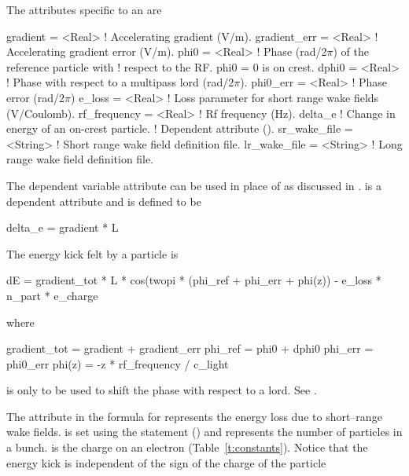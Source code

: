 {{The attributes specific to an  are 
\begin{example}
  gradient     = <Real>   ! Accelerating gradient (V/m).
  gradient_err = <Real>   ! Accelerating gradient error (V/m).
  phi0         = <Real>   ! Phase (rad/2\(\pi\)) of the reference particle with 
                          !   respect to the RF. phi0 = 0 is on crest.
  dphi0        = <Real>   ! Phase with respect to a multipass lord (rad/2\(\pi\)).
  phi0_err     = <Real>   ! Phase error (rad/2\(\pi\))
  e_loss       = <Real>   ! Loss parameter for short range wake fields (V/Coulomb).
  rf_frequency = <Real>   ! Rf frequency (Hz).
  delta_e                 ! Change in energy of an on-crest particle. 
                          !   Dependent attribute ().
  sr_wake_file = <String> ! Short range wake field definition file.
  lr_wake_file = <String> ! Long range wake field definition file.
\end{example}
The dependent variable  attribute can be used in place of
 as discussed in .   is a
dependent attribute and is defined to be
\begin{example}
  delta_e = gradient * L
\end{example}

The energy kick felt by a particle is 
\begin{example}
  dE = gradient_tot * L * cos(twopi * (phi_ref + phi_err + phi(z)) - 
                                                     e_loss * n_part * e_charge 
\end{example}
where
\begin{example}
  gradient_tot = gradient + gradient_err
  phi_ref = phi0 + dphi0
  phi_err = phi0_err
  phi(z) = -z * rf_frequency / c_light
\end{example}
 is only to be used to shift the phase with respect to a 
lord. See .

The  attribute in the formula for  represents the
energy loss due to short--range wake fields.  is set using
the  statement () and represents the
number of particles in a bunch.  is the charge on an
electron (Table~\ref{t:constants}). Notice that the energy kick is
independent of the sign of the charge of the particle

}}
